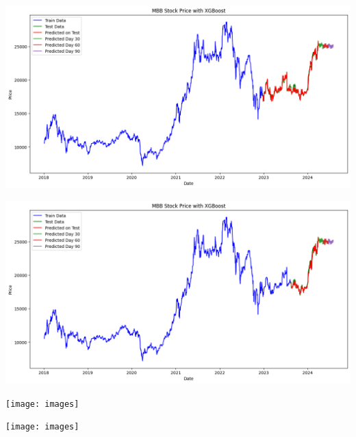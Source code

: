 \documentclass[conference]{IEEEtran}
\begin{document}
\begin{minipage}{0.23\textwidth}
    \centering
    \includegraphics[width=\linewidth]{images/XGBoost/XGBoost_MBB_82.png}
    \label{fig:image1}
\end{minipage}
\hfill
\begin{minipage}{0.23\textwidth}
    \centering
    \includegraphics[width=\linewidth]{images/XGBoost/XGBoost_MBB_91.png}
    \label{fig:image2}
\end{minipage}

\begin{minipage}{0.23\textwidth}
    \centering
    \texttt{[image: images]}
    \label{fig:image1}
\end{minipage}
\hfill
\begin{minipage}{0.23\textwidth}
    \centering
    \texttt{[image: images]}
    \label{fig:image2}
\end{minipage}
\end{document}
